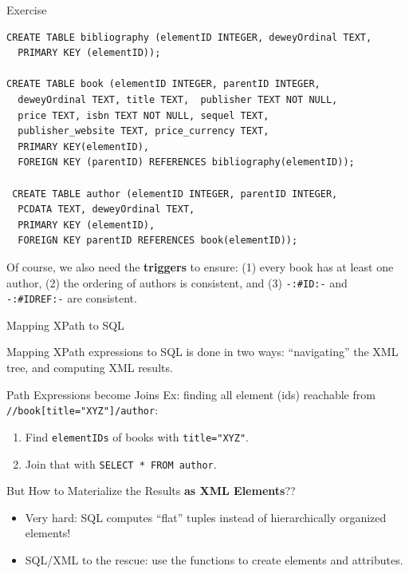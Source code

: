 \begin{frame}[fragile]{Exercise}

\bgroup
\begin{lstlisting}[style=SQL]
CREATE TABLE bibliography (elementID INTEGER, deweyOrdinal TEXT, 
  PRIMARY KEY (elementID));

CREATE TABLE book (elementID INTEGER, parentID INTEGER, 
  deweyOrdinal TEXT, title TEXT,  publisher TEXT NOT NULL, 
  price TEXT, isbn TEXT NOT NULL, sequel TEXT, 
  publisher_website TEXT, price_currency TEXT,
  PRIMARY KEY(elementID),
  FOREIGN KEY (parentID) REFERENCES bibliography(elementID));

 CREATE TABLE author (elementID INTEGER, parentID INTEGER,
  PCDATA TEXT, deweyOrdinal TEXT,
  PRIMARY KEY (elementID),
  FOREIGN KEY parentID REFERENCES book(elementID));
\end{lstlisting}
\egroup

Of course, we also need the \textbf{triggers} to ensure: (1) every book has at least one author, (2) the ordering of authors is consistent, and (3) \lstinline[language=DTD]!-:#ID:-! and \lstinline[language=DTD]!-:#IDREF:-! are consistent.
\end{frame}

\begin{frame}[fragile]{Mapping XPath to SQL}

Mapping XPath expressions to SQL is done in two ways: ``navigating'' the XML tree, and computing XML results.

\begin{block}{Path Expressions become Joins}
Ex: finding all element (ids) reachable from \lstinline!//book[title="XYZ"]/author!:
\begin{enumerate}[(1),noitemsep]
\item Find \lstinline!elementIDs! of books with \lstinline!title="XYZ"!.
\item Join that with \lstinline[style=SQL]!SELECT * FROM author!.
\end{enumerate} 
\end{block}

\begin{block}{But How to Materialize the Results \textbf{as XML Elements}??}
\begin{itemize}[-]
\item Very hard: SQL computes ``flat'' tuples instead of hierarchically organized elements!
\item \alert{SQL/XML to the rescue}: use the functions to create elements and attributes.
\end{itemize}
\end{block}
\end{frame}



